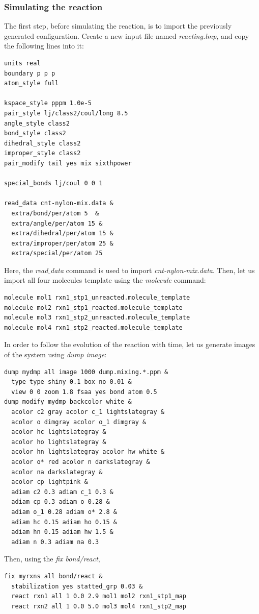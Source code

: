 \documentclass[9pt,tutorial]{livecoms}
\begin{document}
\subsubsection{Simulating the reaction}

The first step, before simulating the reaction, is to import the previously
generated configuration. Create a new input file named \textit{reacting.lmp},
and copy the following lines into it:
{\normalsize
\begin{verbatim}
units real
boundary p p p
atom_style full

kspace_style pppm 1.0e-5
pair_style lj/class2/coul/long 8.5
angle_style class2
bond_style class2
dihedral_style class2
improper_style class2
pair_modify tail yes mix sixthpower

special_bonds lj/coul 0 0 1

read_data cnt-nylon-mix.data &
  extra/bond/per/atom 5  &
  extra/angle/per/atom 15 &
  extra/dihedral/per/atom 15 &
  extra/improper/per/atom 25 &
  extra/special/per/atom 25
\end{verbatim}
}
Here, the \textit{read$\_$data} command is used to import \textit{cnt-nylon-mix.data}.
Then, let us import all four molecules template using the \textit{molecule} command:
{\normalsize
\begin{verbatim}
molecule mol1 rxn1_stp1_unreacted.molecule_template
molecule mol2 rxn1_stp1_reacted.molecule_template
molecule mol3 rxn1_stp2_unreacted.molecule_template
molecule mol4 rxn1_stp2_reacted.molecule_template 
\end{verbatim}
}
In order to follow the evolution of the reaction with time, let us generate images
of the system using \textit{dump image}:
{\normalsize
\begin{verbatim}
dump mydmp all image 1000 dump.mixing.*.ppm &
  type type shiny 0.1 box no 0.01 &
  view 0 0 zoom 1.8 fsaa yes bond atom 0.5
dump_modify mydmp backcolor white &
  acolor c2 gray acolor c_1 lightslategray &
  acolor o dimgray acolor o_1 dimgray &
  acolor hc lightslategray &
  acolor ho lightslategray &
  acolor hn lightslategray acolor hw white &
  acolor o* red acolor n darkslategray &
  acolor na darkslategray &
  acolor cp lightpink &
  adiam c2 0.3 adiam c_1 0.3 &
  adiam cp 0.3 adiam o 0.28 &
  adiam o_1 0.28 adiam o* 2.8 &
  adiam hc 0.15 adiam ho 0.15 &
  adiam hn 0.15 adiam hw 1.5 &
  adiam n 0.3 adiam na 0.3
\end{verbatim}
}
Then, using the \textit{fix bond/react}, 
{\normalsize
\begin{verbatim}
fix myrxns all bond/react &
  stabilization yes statted_grp 0.03 &
  react rxn1 all 1 0.0 2.9 mol1 mol2 rxn1_stp1_map 
  react rxn2 all 1 0.0 5.0 mol3 mol4 rxn1_stp2_map
\end{verbatim}
}
\end{document}
